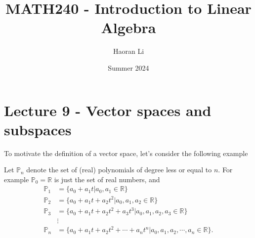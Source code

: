 \documentclass{beamer}
\title{MATH240 - Introduction to Linear Algebra}
\author{Haoran Li}
\institute[UMD]{University of Maryland, College Park}
\date{Summer 2024
}
\theoremstyle{definition}
\theoremstyle{remark}
\begin{document}
\maketitle

\section{Lecture 9 - Vector spaces and subspaces}

\begin{frame}[t]
To motivate the definition of a vector space, let's consider the following example
\pause
\begin{example}\label{17:45-06/27/2022}
Let $\mathbb P_n$ denote the set of (real) polynomials of degree less or equal to $n$\pause. For example $\mathbb P_0=\mathbb R$ is just the set of real numbers, and\pause
\begin{align*}
\mathbb P_1&=\{a_0+a_1t|a_0,a_1\in\mathbb R\} \\
\mathbb P_2&=\{a_0+a_1t+a_2t^2|a_0,a_1,a_2\in\mathbb R\}\\
\mathbb P_3&=\{a_0+a_1t+a_2t^2+a_3t^3|a_0,a_1,a_2,a_3\in\mathbb R\}\\
&\vdots\\
\mathbb P_n&=\{a_0+a_1t+a_2t^2+\cdots+a_nt^n|a_0,a_1,a_2,\cdots,a_n\in\mathbb R\}.
\end{align*}
\end{example}
\end{frame}
\end{document}
